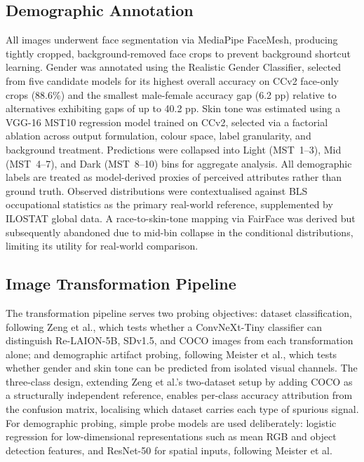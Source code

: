 \subsection{Demographic Annotation}

All images underwent face segmentation via MediaPipe FaceMesh, producing tightly
cropped, background-removed face crops to prevent background shortcut learning. Gender
was annotated using the Realistic Gender Classifier, selected from five candidate models
for its highest overall accuracy on CCv2 face-only crops (88.6\%) and the smallest
male-female accuracy gap (6.2 pp) relative to alternatives exhibiting gaps of up to
40.2 pp. Skin tone was estimated using a VGG-16 MST10 regression model trained on CCv2,
selected via a factorial ablation across output formulation, colour space, label
granularity, and background treatment. Predictions were collapsed into Light (MST~1--3),
Mid (MST~4--7), and Dark (MST~8--10) bins for aggregate analysis. All demographic
labels are treated as model-derived proxies of perceived attributes rather than ground
truth. Observed distributions were contextualised against BLS occupational statistics
as the primary real-world reference, supplemented by ILOSTAT global data. A
race-to-skin-tone mapping via FairFace was derived but subsequently abandoned due to
mid-bin collapse in the conditional distributions, limiting its utility for real-world
comparison.

\subsection{Image Transformation Pipeline}

The transformation pipeline serves two probing objectives: dataset classification,
following Zeng et al., which tests whether a ConvNeXt-Tiny classifier can distinguish
Re-LAION-5B, SDv1.5, and COCO images from each transformation alone; and demographic
artifact probing, following Meister et al., which tests whether gender and skin tone can
be predicted from isolated visual channels. The three-class design, extending Zeng et
al.'s two-dataset setup by adding COCO as a structurally independent reference, enables
per-class accuracy attribution from the confusion matrix, localising which dataset
carries each type of spurious signal. For demographic probing, simple probe models are
used deliberately: logistic regression for low-dimensional representations such as mean
RGB and object detection features, and ResNet-50 for spatial inputs, following Meister
et al.

